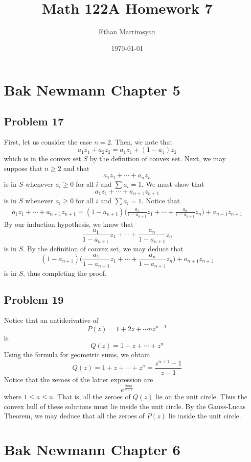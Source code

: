 \documentclass[12pt]{article}
\begin{document}
 
\title{Math 122A Homework 7}
\author{Ethan Martirosyan}
\date{\today}
\maketitle
{}
\hfuzz=50pt
\section*{Bak Newmann Chapter 5}
\subsection*{Problem 17}
First, let us consider the case $n = 2$. Then, we note that
\[
a_1z_1 + a_2 z_2 = a_1 z_1 + (1-a_1)z_2
\] which is in the convex set $S$ by the definition of convex set. Next, we may suppose that $n\geq 2$ and that
\[
a_1 z_1 + \cdots + a_n z_n
\] is in $S$ whenever $a_i \geq 0$ for all $i$ and $\sum a_i = 1$. We must show that
\[
a_1 z_1 + \cdots + a_{n+1} z_{n+1}
\] is in $S$ whenever $a_i \geq 0$ for all $i$ and $\sum a_i = 1$. Notice that
\begin{align*}
a_1 z_1 + \cdots + a_{n+1}z_{n+1} = (1-a_{n+1})\Bigg(\frac{a_1}{1-a_{n+1}}z_1 + \cdots + \frac{a_n}{1-a_{n+1}}z_n\Bigg) + a_{n+1}z_{n+1}
\end{align*} By our induction hypothesis, we know that
\[
\frac{a_1}{1-a_{n+1}}z_1 + \cdots + \frac{a_n}{1-a_{n+1}}z_n
\] is in $S$. By the definition of convex set, we may deduce that
\[
(1-a_{n+1})\Bigg(\frac{a_1}{1-a_{n+1}}z_1 + \cdots + \frac{a_n}{1-a_{n+1}}z_n\Bigg) + a_{n+1}z_{n+1}
\] is in $S$, thus completing the proof.
\newpage
\subsection*{Problem 19}
Notice that an antiderivative of
\[
P(z) = 1 + 2z + \cdots nz^{n-1}
\] is
\[
Q(z) = 1 + z + \cdots + z^n
\] Using the formula for geometric sums, we obtain
\[
Q(z) =  1 + z + \cdots + z^n = \frac{z^{n+1}-1}{z-1}
\] Notice that the zeroes of the latter expression are
\[
e^\frac{2\pi i a}{n+1}
\] where $1 \leq a \leq n$. That is, all the zeroes of $Q(z)$ lie on the unit circle. Thus the convex hull of these solutions must lie inside the unit circle. By the Gauss-Lucas Theorem, we may deduce that all the zeroes of $P(z)$ lie inside the unit circle.
\newpage
\section*{Bak Newmann Chapter 6}
\end{document}
